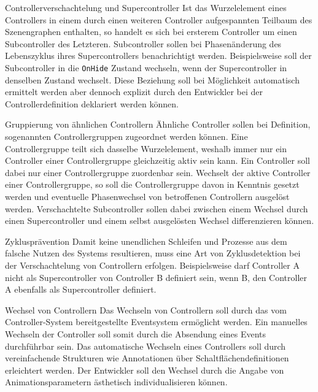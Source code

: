 \begin{freq}{Controllerverschachtelung und Supercontroller}
	Ist das Wurzelelement eines Controllers in einem durch einen weiteren Controller aufgespannten Teilbaum des Szenengraphen enthalten, so handelt es sich bei ersterem Controller um einen Subcontroller des Letzteren. Subcontroller sollen bei Phasenänderung des Lebenszyklus ihres Supercontrollers benachrichtigt werden. Beispielsweise soll der Subcontroller in die \texttt{OnHide} Zustand wechseln, wenn der Supercontroller in denselben Zustand wechselt. Diese Beziehung soll bei Möglichkeit automatisch ermittelt werden aber dennoch explizit durch den Entwickler bei der Controllerdefinition deklariert werden können.
\end{freq}
\begin{freq}{Gruppierung von ähnlichen Controllern}
	Ähnliche Controller sollen bei Definition, sogenannten Controllergruppen zugeordnet werden können. Eine Controllergruppe teilt sich dasselbe Wurzelelement, weshalb immer nur ein Controller einer Controllergruppe gleichzeitig aktiv sein kann. Ein Controller soll dabei nur einer Controllergruppe zuordenbar sein. Wechselt der aktive Controller einer Controllergruppe, so soll die Controllergruppe davon in Kenntnis gesetzt werden und eventuelle Phasenwechsel von betroffenen Controllern ausgelöst werden. Verschachtelte Subcontroller sollen dabei zwischen einem Wechsel durch einen Supercontroller und einem selbst ausgelösten Wechsel differenzieren können.
\end{freq}
\begin{freq}{Zyklusprävention}
	Damit keine unendlichen Schleifen und Prozesse aus dem falsche Nutzen des Systems resultieren, muss eine Art von Zyklusdetektion bei der Verschachtelung von Controllern erfolgen. Beispielsweise darf Controller A nicht als Supercontroller von Controller B definiert sein, wenn B, den Controller A ebenfalls als Supercontroller definiert.
\end{freq}
\begin{freq}{Wechsel von Controllern}
	Das Wechseln von Controllern soll durch das vom Controller-System bereitgestellte Eventsystem ermöglicht werden. Ein manuelles Wechseln der Controller soll somit durch die Absendung eines Events durchführbar sein. Das automatische Wechseln eines Controllers soll durch vereinfachende Strukturen wie Annotationen über Schaltflächendefinitionen erleichtert werden. Der Entwickler soll den Wechsel durch die Angabe von Animationsparametern ästhetisch individualisieren können.
\end{freq}
